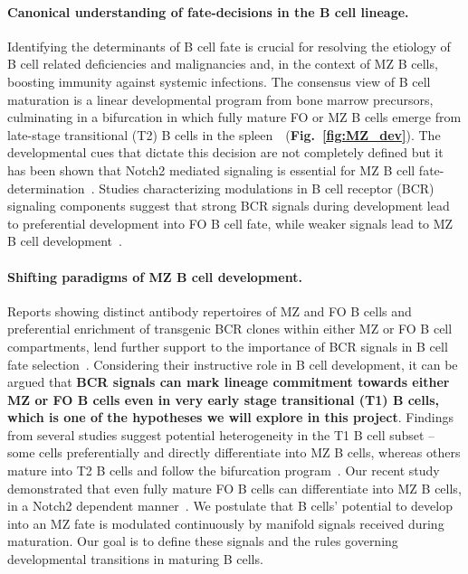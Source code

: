 \documentclass[11pt]{article}
\newcommand{\para}[1]{\vspace*{-4.5mm}\paragraph{#1}}
\begin{document}
\para{Canonical understanding of fate-decisions in the B cell lineage.}
Identifying the determinants of B cell fate is crucial for resolving the etiology of B cell related deficiencies and malignancies and, in the context of MZ B cells,  boosting immunity against systemic infections. 
The consensus view of B cell maturation is a linear developmental program from bone marrow precursors, culminating in a bifurcation in which fully mature FO or MZ B cells emerge from late-stage transitional (T2) B cells in the spleen~\cite{Allman_1993, Rolink_1998,  Loder_1999,  Allman_2001, Su_2002, Verma_2007, Allman_2008, Pillai_2005}~(\textbf{Fig.~\ref{fig:MZ_dev}}). 
The developmental cues that dictate this decision are not completely defined but it has been shown that Notch2 mediated signaling is essential for MZ B cell fate-determination~\cite{Tanigaki_2002, Saito_2003, Witt_2003, Hozumi_2004}.
Studies characterizing modulations in B cell receptor (BCR) signaling components suggest that strong BCR signals during development lead to preferential development into FO B cell fate, while weaker signals lead to MZ B cell development~\cite{Cariappa_2001, Seo_2001, Samardzic_2002,  Pillai_2005}.

\para{Shifting paradigms of MZ B cell development.}
Reports showing distinct antibody repertoires of MZ and FO B cells and preferential enrichment of transgenic BCR clones within either MZ or FO B cell compartments, lend further support to the importance of BCR signals in B cell fate selection~\cite{Lopes_Carvalho_2004, Martin_2000, Chen_1997, Ghraichy_2021, Carey_2008,  Yang_Shih_2002, Zikherman_2012, Tsiantoulas_2017}.
Considering their instructive role in B cell development, it can be argued that \textbf{BCR signals can  mark lineage commitment towards either MZ or FO B cells even in very early stage transitional (T1) B cells, which is one of the hypotheses we will explore in this project}.
Findings from several studies suggest potential heterogeneity in the T1 B cell subset -- some cells preferentially and directly differentiate into MZ B cells, whereas others mature into T2 B cells and follow the bifurcation program~\cite{Hammad_2017, Tan_2009, Roundy_2010, Hampel_2011}.
Our recent study demonstrated that even fully mature FO B cells can differentiate into MZ B cells, in a Notch2 dependent manner~\cite{Lechner_2021}. %
We postulate that B cells' potential to develop into an MZ fate is modulated continuously by manifold signals received during maturation. Our goal is to define these signals and the rules governing developmental transitions in maturing B cells.
\end{document}
